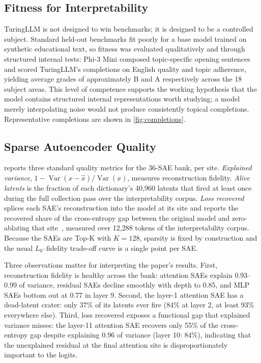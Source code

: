 \documentclass[10pt]{article}
\begin{document}
\subsection{Fitness for Interpretability}

TuringLLM is not designed to win benchmarks; it is designed to be a controlled subject.
Standard held-out benchmarks fit poorly for a base model trained on synthetic educational text, so fitness was evaluated qualitatively and through structured internal tests: Phi-3 Mini composed topic-specific opening sentences and scored TuringLLM's completions on English quality and topic adherence, yielding average grades of approximately B and A respectively across the 18 subject areas.
This level of competence supports the working hypothesis that the model contains structured internal representations worth studying; a model merely interpolating noise would not produce consistently topical completions.
Representative completions are shown in \cref{fig:completions}.

\subsection{Sparse Autoencoder Quality}
\label{app:sae-quality}

 reports three standard quality metrics for the 36-SAE bank, per site.
\emph{Explained variance}, $1 - \operatorname{Var}(x - \hat{x}) / \operatorname{Var}(x)$, measures reconstruction fidelity.
\emph{Alive latents} is the fraction of each dictionary's 40,960 latents that fired at least once during the full collection pass over the interpretability corpus.
\emph{Loss recovered} splices each SAE's reconstruction into the model at its site and reports the recovered share of the cross-entropy gap between the original model and zero-ablating that site~\citep{marks2025sparse}, measured over 12{,}288 tokens of the interpretability corpus.
Because the SAEs are Top-K with $K = 128$, sparsity is fixed by construction and the usual $L_0$--fidelity trade-off curve is a single point per SAE.

Three observations matter for interpreting the paper's results.
First, reconstruction fidelity is healthy across the bank: attention SAEs explain 0.93--0.99 of variance, residual SAEs decline smoothly with depth to 0.85, and MLP SAEs bottom out at 0.77 in layer 9.
Second, the layer-1 attention SAE has a dead-latent crater: only 37\% of its latents ever fire (84\% at layer 2, at least 93\% everywhere else).
Third, loss recovered exposes a functional gap that explained variance misses: the layer-11 attention SAE recovers only 55\% of the cross-entropy gap despite explaining 0.96 of variance (layer 10: 84\%), indicating that the unexplained residual at the final attention site is disproportionately important to the logits.
\end{document}
